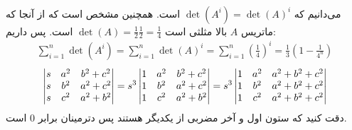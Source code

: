 \\
می‌دانیم که
$\det(A^i) = \det(A)^i$
است. همچنین مشخص است که از آنجا که ماتریس
$A$
بالا مثلثی است
$\det(A) = \frac{1}{2} \frac{1}{2} = \frac{1}{4}$
است. پس داریم:
\begin{gather*}
    \sum_{i=1}^n \det(A^i) = \sum_{i=1}^n \det(A)^i = \sum_{i=1}^n (\frac{1}{4})^i = \frac{1}{3}(1-\frac{1}{4^n})
\end{gather*}
\begin{gather*}
    \begin{vmatrix}
        s & a^2 & b^2+c^2 \\ 
        s & b^2 & a^2+c^2 \\ 
        s & c^2 & a^2+b^2 \notag
    \end{vmatrix}
    =
    s^3 \begin{vmatrix}
        1 & a^2 & b^2+c^2 \\ 
        1 & b^2 & a^2+c^2 \\ 
        1 & c^2 & a^2+b^2 \notag
    \end{vmatrix}
    =
    s^3 \begin{vmatrix}
        1 & a^2 & a^2+b^2+c^2 \\ 
        1 & b^2 & a^2+b^2+c^2 \\ 
        1 & c^2 & a^2+b^2+c^2 \notag
    \end{vmatrix}
\end{gather*}
دقت کنید که ستون اول و آخر مضربی از یکدیگر هستند پس دترمینان برابر 0 است.



